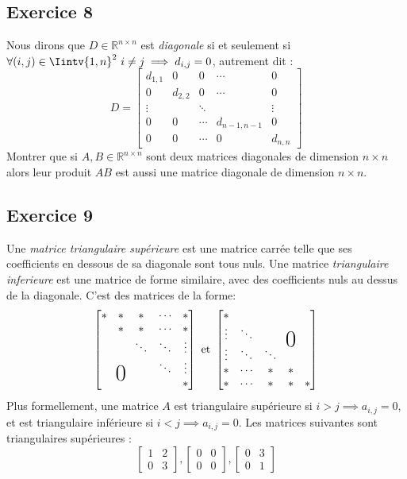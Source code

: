 \documentclass{article}
\newcommand{\R}{\mathbb{R}}
\newcommand{\cross}{\times}
\newcommand{\bigzero}{\makebox(0,0){\text{\huge0}}}
\begin{document}
\subsection*{Exercice 8}
\noindent Nous dirons que $D \in \R^{n \cross n}$ est \textit{diagonale} si et seulement si $\forall (i,j) \in \Iintv{1,n}^2 \ i \neq j \implies d_{i,j} = 0$, autrement dit :
$$
D = \begin{bmatrix}
d_{1,1} & 0 & 0 & \cdots & 0\\
0 & d_{2,2} & 0 & \cdots & 0 \\
\vdots & &\ddots & & \vdots \\
0 & 0 & \cdots & d_{n-1, n-1} & 0\\
0 & 0 &\cdots& 0 & d_{n,n}
\end{bmatrix}
$$ 
\noindent Montrer que si $A,B \in \R^{n \cross n}$ sont deux matrices diagonales de dimension $n\times n$ alors leur produit $AB$ est aussi une matrice diagonale de dimension $n\times n$. 

\subsection*{Exercice 9}
\noindent Une \textit{matrice triangulaire supérieure} est une matrice carrée telle que ses coefficients en dessous de sa diagonale sont tous nuls. Une matrice \textit{triangulaire inferieure} est une matrice de forme similaire, avec des coefficients nuls au dessus de la diagonale. C'est des matrices de la forme:
$$\begin{bmatrix}
* & * & * & \cdots & * \\
  & * & * & \cdots & * \\
  &   & \ddots & \ddots & \vdots \\
  & \bigzero  &  & \ddots & \vdots \\
  &   &   &  & *
\end{bmatrix} \text{ et }
\begin{bmatrix}
* &  &  &  &  \\
\vdots  & \ddots &  & \bigzero &  \\
\vdots & \ddots & \ddots &  &  \\
* & \cdots & * & * &  \\
*  & \cdots & * & * & *
\end{bmatrix}$$
Plus formellement, une matrice $A$ est triangulaire supérieure si $i > j \implies a_{i,j} = 0$, et est triangulaire inférieure si $i < j \implies a_{i,j} = 0$. Les matrices suivantes sont triangulaires supérieures :
$$
\begin{bmatrix}
1 & 2\\
0 & 3
\end{bmatrix}, \begin{bmatrix}
0 & 0\\
0 & 0
\end{bmatrix},
\begin{bmatrix}
0 & 3\\
0 & 1
\end{bmatrix}
$$
\end{document}
